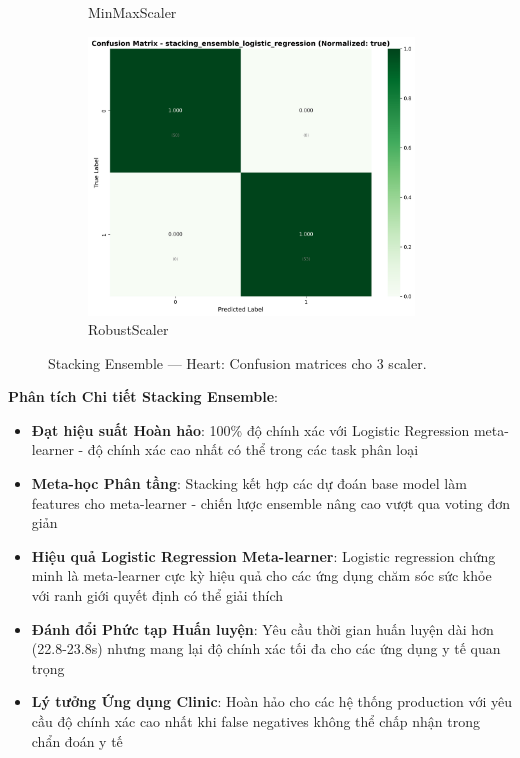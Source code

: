 \begin{figure}[H]
\begin{subfigure}[b]{0.31\textwidth}
\caption{MinMaxScaler}\label{fig:stacking_heart_cm_minmax}
\end{subfigure}\hfill
\begin{subfigure}[b]{0.31\textwidth}\centering
\includegraphics[width=0.95\textwidth]{Result/heart_dataset/confusion_matrices/stacking_ensemble_logistic_regression_numeric_dataset_RobustScaler.png}
\caption{RobustScaler}\label{fig:stacking_heart_cm_robust}
\end{subfigure}
\caption{Stacking Ensemble — Heart: Confusion matrices cho 3 scaler.}
\label{fig:stacking_heart_confusions}
\end{figure}

\textbf{Phân tích Chi tiết Stacking Ensemble}:
\begin{itemize}
    \item \textbf{Đạt hiệu suất Hoàn hảo}: 100\% độ chính xác với Logistic Regression meta-learner - độ chính xác cao nhất có thể trong các task phân loại
    \item \textbf{Meta-học Phân tầng}: Stacking kết hợp các dự đoán base model làm features cho meta-learner - chiến lược ensemble nâng cao vượt qua voting đơn giản
    \item \textbf{Hiệu quả Logistic Regression Meta-learner}: Logistic regression chứng minh là meta-learner cực kỳ hiệu quả cho các ứng dụng chăm sóc sức khỏe với ranh giới quyết định có thể giải thích
    \item \textbf{Đánh đổi Phức tạp Huấn luyện}: Yêu cầu thời gian huấn luyện dài hơn (22.8-23.8s) nhưng mang lại độ chính xác tối đa cho các ứng dụng y tế quan trọng
    \item \textbf{Lý tưởng Ứng dụng Clinic}: Hoàn hảo cho các hệ thống production với yêu cầu độ chính xác cao nhất khi false negatives không thể chấp nhận trong chẩn đoán y tế
\end{itemize}


